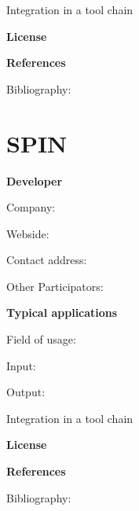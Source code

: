 \documentclass{./template/openetcs2}
\begin{document}



	Integration in a tool chain



	\textbf{License}


	\textbf{References}

	Bibliography:


\section{SPIN}

	\textbf{Developer}

	Company: 

	Webside:

	Contact address:

	Other  Participators:



	\textbf{Typical applications}

	Field of usage:


	Input:

	Output:





	Integration in a tool chain



	\textbf{License}


	\textbf{References}

	Bibliography:
\end{document}
